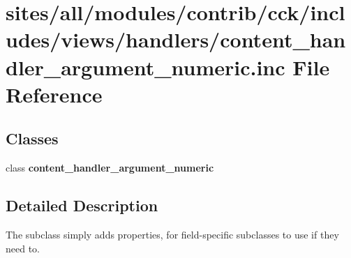 \hypertarget{content__handler__argument__numeric_8inc}{
\section{sites/all/modules/contrib/cck/includes/views/handlers/content\_\-handler\_\-argument\_\-numeric.inc File Reference}
\label{content__handler__argument__numeric_8inc}
}
\subsection*{Classes}
\begin{CompactItemize}
\item 
class \textbf{content\_\-handler\_\-argument\_\-numeric}
\end{CompactItemize}


\subsection{Detailed Description}
The subclass simply adds properties, for field-specific subclasses to use if they need to. 